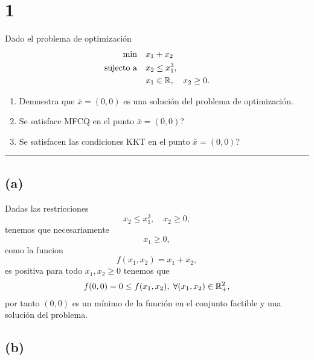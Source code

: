 \section*{1}

Dado el problema de optimización
\begin{equation*}
\begin{aligned}
    \min \quad & x_1 + x_2 \\
    \text{sujecto a} \quad & x_2 \leq x_1^3, \\
        & x_1 \in \mathbb{R}, \quad x_2 \geq 0.
\end{aligned}
\end{equation*}

\begin{enumerate}[label=(\alph*)]
    \item Demuestra que $\bar{x} = (0, 0)$ es una solución del problema de optimización.
    \item Se satisface MFCQ en el punto $\bar{x} = (0, 0)$?
    \item Se satisfacen las condiciones KKT en el punto $\bar{x} = (0, 0)$?
\end{enumerate}

\noindent\rule{10cm}{0.4pt}

\subsection*{(a)}

Dadas las restricciones
\begin{equation*}
    x_2 \leq x_1^3, \quad x_2 \geq 0,
\end{equation*}
tenemos que necesariamente
\begin{equation*}
    x_1 \geq 0,
\end{equation*}
como la funcion
\begin{equation*}
    f(x_1, x_2) = x_1 + x_2,
\end{equation*}
es positiva para todo $x_1, x_2 \geq 0$ tenemos que
\begin{equation*}
    f(0,0) = 0 \leq f(x_1, x_2), \; \forall (x_1, x_2) \in \mathbb{R}^{2}_{+},
\end{equation*}
por tanto $(0, 0)$ es un mínimo de la función en el conjunto factible y una solución del problema.


\subsection*{(b)}

